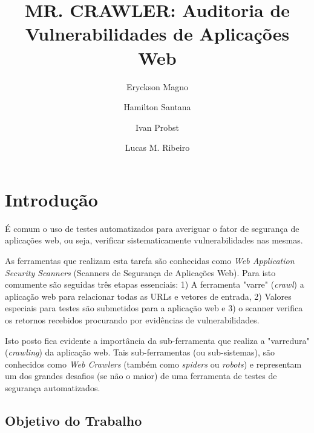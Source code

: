 ﻿\documentclass[twocolumn,showpacs,%
  nofootinbib,aps,superscriptaddress,%
  eqsecnum,prd,notitlepage,showkeys,10pt]{revtex4-1}
\begin{document}
\def\acknowledgmentsname{Agradecimentos}
\def\andname{e}
\def\indexname{Indíce}
\def\figuresname{Figuras}%
\def\tablename{TABELA}
\def\tablesname{Tabelas}%

\title{MR. CRAWLER: Auditoria de Vulnerabilidades de Aplicações Web}
\author{Eryckson Magno}
\author{Hamilton Santana}
\author{Ivan Probst}
\author{Lucas M. Ribeiro}


\maketitle

\section{Introdução}
\label{sec:introducao}

É comum o uso de testes automatizados para averiguar o fator de segurança de aplicações web, ou seja, verificar sistematicamente vulnerabilidades nas mesmas.

As ferramentas que realizam esta tarefa são conhecidas como \emph{Web Application Security Scanners} (Scanners de Segurança de Aplicações Web). Para isto comumente são seguidas três etapas essenciais: 1) A ferramenta "varre" (\emph{crawl}) a aplicação web para relacionar todas as URLs e vetores de entrada, 2) Valores especiais para testes são submetidos para a aplicação web e 3) o scanner verifica os retornos recebidos procurando por evidências de vulnerabilidades.

Isto posto fica evidente a importância da sub-ferramenta que realiza a "varredura" (\emph{crawling}) da aplicação web. Tais sub-ferramentas (ou sub-sistemas), são conhecidos como \emph{Web Crawlers} (também como \emph{spiders} ou \emph{robots}) e representam um dos grandes desafios (se não o maior) de uma ferramenta de testes de segurança automatizados.

\subsection{Objetivo do Trabalho}
\end{document}
